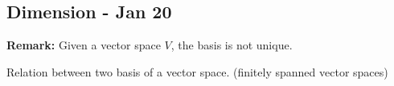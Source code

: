 \documentclass[12pt]{article}
\newtheorem{theorem}{Theorem}[subsection]
\begin{document}




	\newpage

	\subsection{Dimension - Jan 20}
	
	\textbf{Remark:} Given a vector space $V$, the basis is not unique. 

	Relation between two basis of a vector space. (finitely spanned vector 
	spaces)\\
\end{document}

